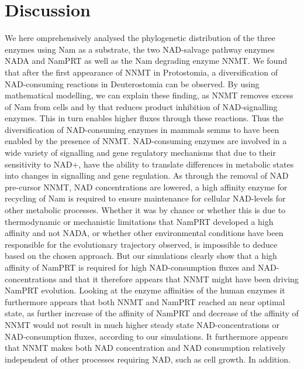 
\section{Discussion}

We here omprehensively analysed the phylogenetic distribution of the three enzymes using Nam as a substrate, the two NAD-salvage pathway enzymes NADA and NamPRT as well as the Nam degrading enzyme NNMT. We found that after the first appearance of NNMT in Protostomia, a diversification of NAD-consuming reactions in Deuterostomia can be observed. By using mathematical modelling, we can explain these finding, as NNMT removes excess of Nam from cells and by that reduces product inhibition of NAD-signalling enzymes. This in turn enables higher fluxes through these reactions.  Thus the diversification of  NAD-consuming enzymes in mammals semms to have been enabled by the presence of NNMT. NAD-consuming enzymes are involved in a wide variety of signalling and gene regulatory mechanisms that due to their sensitivity to NAD+, have the ability to translate differences in metabolic  states into changes in signalling and gene regulation.  As through the removal of NAD pre-cursor NNMT, NAD concentrations are lowered, a high affinity enzyme for recycling of Nam is required to ensure maintenance for cellular NAD-levels for other metabolic processes. Whether it was by chance or whether this is due to thermodynamic or mechanistic limitations that NamPRT developed a high affinity and not NADA, or whether other environmental conditions have been responsible for the evolutionary trajectory observed, is impossible to deduce based on the chosen approach.  But our simulations clearly show that a high affinity of NamPRT is required for high NAD-consumption fluxes and NAD-concentrations and that it therefore appears that NNMT might have been driving NamPRT evolution. Looking at the enzyme affinities of the human enzymes it furthermore appears  that both NNMT and NamPRT reached an near optimal state, as further increase of the affinity of NamPRT and decrease of the affinity of NNMT would not result in much higher steady state NAD-concentrations or NAD-consumption fluxes, according to our simulations.  It furthermore appears that NNMT makes both NAD concentration and NAD consumption relatively independent of other processes requiring NAD, such as cell growth. In addition. 

